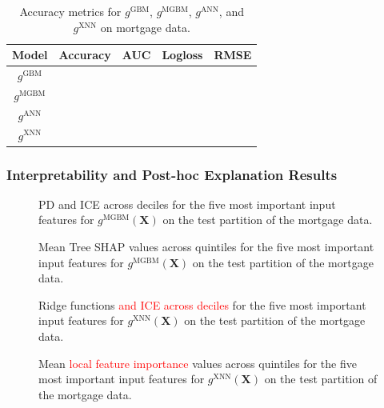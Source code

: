 \documentclass[information,article,submit,moreauthors,pdftex]{definitions/mdpi}
\begin{document}
\begin{table}[H]
\label{tab:mort_acc}
\caption{Accuracy metrics for $g^\text{GBM}$, $g^\text{MGBM}$, $g^\text{ANN}$, and $g^\text{XNN}$ on mortgage data.}
\centering
\begin{tabular}{ccccc}
\toprule
\textbf{Model}		& \textbf{Accuracy}	& \textbf{AUC}	 & \textbf{Logloss}	& \textbf{RMSE}\\
\midrule
$g^\text{GBM}$		& 				& 			& 				& \\
$g^\text{MGBM}$	& 				& 			& 				& \\
$g^\text{ANN}$		& 				& 			& 				& \\
$g^\text{XNN}$		& 				& 			& 				& \\
\bottomrule
\end{tabular}
\end{table}

\subsubsection{Interpretability and Post-hoc Explanation Results}

\begin{figure}[H]
\centering
\label{fig:mort_mgbm_glob}
\caption{PD and ICE across deciles for the five most important input features for $g^\text{MGBM}(\mathbf{X})$ on the test partition of the mortgage data.}
\end{figure}   

\begin{figure}[H]
\centering
\label{fig:mort_mgbm_loc}
\caption{Mean Tree SHAP values across quintiles for the five most important input features for $g^\text{MGBM}(\mathbf{X})$ on the test partition of the mortgage data.}
\end{figure}   

\begin{figure}[H]
\centering
\label{fig:mort_xnn_glob}
\caption{Ridge functions \textcolor{red}{and ICE across deciles} for the five most important input features for $g^\text{XNN}(\mathbf{X})$ on the test partition of the mortgage data.}
\end{figure}   

\begin{figure}[H]
\centering
\label{fig:fig:mort_xnn_glob}
\caption{Mean \textcolor{red}{local feature importance} values across quintiles for the five most important input features for $g^\text{XNN}(\mathbf{X})$ on the test partition of the mortgage data.}
\end{figure}  
\end{document}
